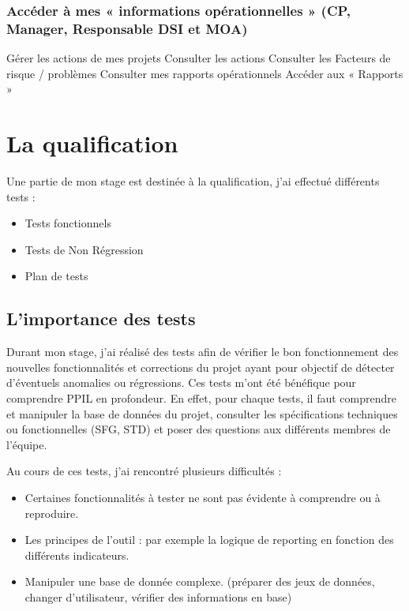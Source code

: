\subsubsection{Accéder à mes « informations opérationnelles » (CP, Manager, Responsable DSI et MOA)}
Gérer les actions de mes projets
Consulter les actions
Consulter les Facteurs de risque / problèmes
Consulter mes rapports opérationnels
Accéder aux « Rapports »


\section{La qualification}

Une partie de mon stage est destinée à la qualification, j'ai effectué différents tests :
\begin{itemize}
    \item Tests fonctionnels
    \item Tests de Non Régression
    \item Plan de tests
\end{itemize}

\subsection{L'importance des tests}

Durant mon stage, j'ai réalisé des tests afin de vérifier le bon fonctionnement des nouvelles fonctionnalités et corrections du projet ayant pour objectif de détecter d'éventuels anomalies ou régressions. Ces tests m'ont été bénéfique pour comprendre PPIL en profondeur. En effet, pour chaque tests, il faut comprendre et manipuler la base de données du projet, consulter les spécifications techniques ou fonctionnelles (SFG, STD) et poser des questions aux différents membres de l'équipe.

Au cours de ces tests, j'ai rencontré plusieurs difficultés : 

\begin{itemize}
    \item Certaines fonctionnalités à tester ne sont pas évidente à comprendre ou à reproduire.
    \item Les principes de l'outil : par exemple la logique de reporting en fonction des différents indicateurs.
    \item Manipuler une base de donnée complexe. (préparer des jeux de données, changer d'utilisateur, vérifier des informations en base)
\end{itemize}

